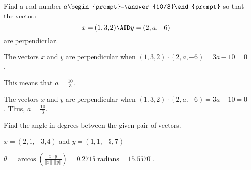 \documentclass{article}
\begin{document}



\problemlabel

\begin{exercise} \label{c1.4.2}
Find a real number $a\begin{prompt}=\answer{10/3}\end{prompt}$ so that the vectors
\[
x = (1,3,2) \AND y = (2,a,-6)
\]
are perpendicular.
\begin{hint}
  The vectors $x$ and $y$ are perpendicular when
$(1,3,2) \cdot (2,a,-6) = 3a - 10 = 0$.
\end{hint}
\begin{hint}
  This means that $a = \frac{10}{3}$.
\end{hint}

\begin{solution}

The vectors $x$ and $y$ are perpendicular when $(1,3,2) \cdot (2,a,-6) = 3a - 10 = 0$.  Thus, $a = \frac{10}{3}$.

\end{solution}
\end{exercise}





\matlabproblemlabel

\noindent Find the angle in degrees between the given pair of vectors.

\begin{computerExercise} \label{c1.4.6a}
$x=(2,1,-3,4)$ and $y=(1,1,-5,7)$.

\begin{solution}
$\theta =
\arccos \left(\frac{x \cdot y}{||x||\;||y||}\right) =
0.2715 \; \mbox{radians} = 15.5570^\circ$.

\end{solution}
\end{computerExercise}


\end{document}
